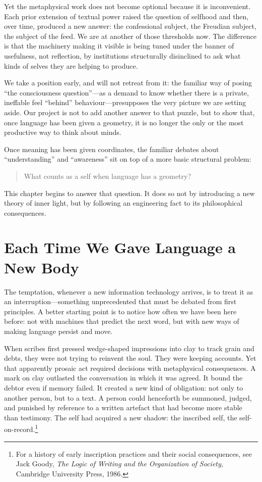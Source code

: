 Yet the metaphysical work does not become optional because it is inconvenient. Each prior extension of textual power raised the question of selfhood and then, over time, produced a new answer: the confessional subject, the Freudian subject, the subject of the feed. We are at another of those thresholds now. The difference is that the machinery making it visible is being tuned under the banner of usefulness, not reflection, by institutions structurally disinclined to ask what kinds of selves they are helping to produce.

We take a position early, and will not retreat from it: the familiar way of posing ``the consciousness question''---as a demand to know whether there is a private, ineffable feel ``behind'' behaviour---presupposes the very picture we are setting aside. Our project is not to add another answer to that puzzle, but to show that, once language has been given a geometry, it is no longer the only or the most productive way to think about minds.

Once meaning has been given coordinates, the familiar debates about ``understanding'' and ``awareness'' sit on top of a more basic structural problem:

\begin{quote}
What counts as a self when language has a geometry?
\end{quote}

This chapter begins to answer that question. It does so not by introducing a new theory of inner light, but by following an engineering fact to its philosophical consequences.

\section{Each Time We Gave Language a New Body}

The temptation, whenever a new information technology arrives, is to treat it as an interruption---something unprecedented that must be debated from first principles. A better starting point is to notice how often we have been here before: not with machines that predict the next word, but with new ways of making language persist and move.

When scribes first pressed wedge-shaped impressions into clay to track grain and debts, they were not trying to reinvent the soul. They were keeping accounts. Yet that apparently prosaic act required decisions with metaphysical consequences. A mark on clay outlasted the conversation in which it was agreed. It bound the debtor even if memory failed. It created a new kind of obligation: not only to another person, but to a text. A person could henceforth be summoned, judged, and punished by reference to a written artefact that had become more stable than testimony. The self had acquired a new shadow: the inscribed self, the self-on-record.\footnote{For a history of early inscription practices and their social consequences, see Jack Goody, \emph{The Logic of Writing and the Organization of Society}, Cambridge University Press, 1986.}

